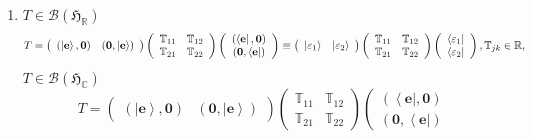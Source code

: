 \documentclass[aps,preprint]{revtex4}
\begin{document}
\begin{enumerate}
\item $T\in \mathcal{B}\left( \mathfrak{H}_{\mathbb{R}}\right) $%
\begin{equation}
T=\left( 
\begin{array}{cc}
\left( \left\vert \mathbf{e}\right\rangle ,\mathbf{0}\right) & \left( 
\mathbf{0,}\left\vert \mathbf{e}\right\rangle \right)%
\end{array}%
\right) \left( 
\begin{array}{cc}
\mathbb{T}_{11} & \mathbb{T}_{12} \\ 
\mathbb{T}_{21} & \mathbb{T}_{22}%
\end{array}%
\right) \left( 
\begin{array}{c}
\left( \left\langle \mathbf{e}\right\vert ,\mathbf{0}\right) \\ 
\left( \mathbf{0,}\left\langle \mathbf{e}\right\vert \right)%
\end{array}%
\right) \equiv \left( 
\begin{array}{cc}
\left\vert \mathbf{\varepsilon }_{1}\right\rangle & \left\vert \mathbf{%
\varepsilon }_{2}\right\rangle%
\end{array}%
\right) \left( 
\begin{array}{cc}
\mathbb{T}_{11} & \mathbb{T}_{12} \\ 
\mathbb{T}_{21} & \mathbb{T}_{22}%
\end{array}%
\right) \left( 
\begin{array}{c}
\left\langle \mathbf{\varepsilon }_{1}\right\vert \\ 
\left\langle \mathbf{\varepsilon }_{2}\right\vert%
\end{array}%
\right) ,\mathbb{T}_{jk}\in \mathbb{R},
\end{equation}%
$T\in \mathcal{B}\left( \mathfrak{H}_{\mathbb{C}}\right) $%
\begin{equation}
T=\left( 
\begin{array}{cc}
\left( \left\vert \mathbf{e}\right\rangle ,\mathbf{0}\right) & \left( 
\mathbf{0,}\left\vert \mathbf{e}\right\rangle \right)%
\end{array}%
\right) \left( 
\begin{array}{cc}
\mathbb{T}_{11} & \mathbb{T}_{12} \\ 
\mathbb{T}_{21} & \mathbb{T}_{22}%
\end{array}%
\right) \left( 
\begin{array}{c}
\left( \left\langle \mathbf{e}\right\vert ,\mathbf{0}\right) \\ 
\left( \mathbf{0,}\left\langle \mathbf{e}\right\vert \right)%

\end{array}
\end{equation}
\end{enumerate}
\end{document}

